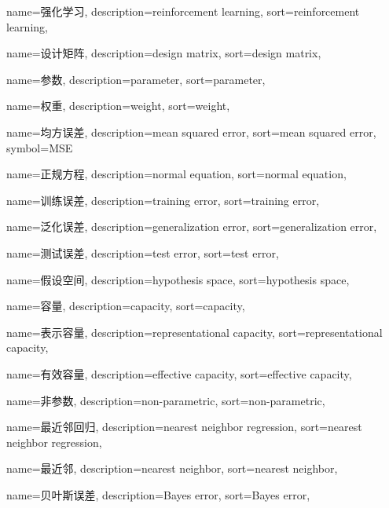 {
  name=强化学习,
  description={reinforcement learning},
  sort={reinforcement learning},
}

{
  name=设计矩阵,
  description={design matrix},
  sort={design matrix},
}

{
  name=参数,
  description={parameter},
  sort={parameter},
}

{
  name=权重,
  description={weight},
  sort={weight},
}

{
  name=均方误差,
  description={mean squared error},
  sort={mean squared error},
  symbol={MSE}
}

{
  name=正规方程,
  description={normal equation},
  sort={normal equation},
}

{
  name=训练误差,
  description={training error},
  sort={training error},
}

{
  name=泛化误差,
  description={generalization error},
  sort={generalization error},
}

{
  name=测试误差,
  description={test error},
  sort={test error},
}

{
  name=假设空间,
  description={hypothesis space},
  sort={hypothesis space},
}

{
  name=容量,
  description={capacity},
  sort={capacity},
}

{
  name=表示容量,
  description={representational capacity},
  sort={representational capacity},
}

{
  name=有效容量,
  description={effective capacity},
  sort={effective capacity},
}

{
  name=非参数,
  description={non-parametric},
  sort={non-parametric},
}

{
  name=最近邻回归,
  description={nearest neighbor regression},
  sort={nearest neighbor regression},
}

{
  name=最近邻,
  description={nearest neighbor},
  sort={nearest neighbor},
}

{
  name=贝叶斯误差,
  description={Bayes error},
  sort={Bayes error},
}

